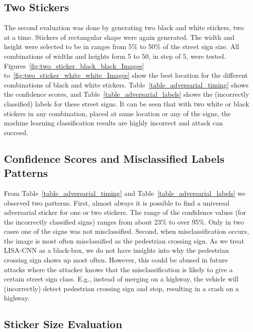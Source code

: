 \subsection{Two Stickers}

The second evaluation was done by generating two black and white stickers, two at a time. Stickers of rectangular shape were again generated. The width and height were selected to be in ranges from 5\% to 50\% of the street sign size. All combinations of widths and heights form 5 to 50, in step of 5, were tested. Figures~\ref{fig:two_sticker_black_black_Images} to~\ref{fig:two_sticker_white_white_Images} show the best location for the different combinations of black and white stickers. Table~\ref{table_adversarial_timing} shows the confidence scores, and Table~\ref{table_adversarial_labels} shows the (incorrectly classified) labels for these street signs. It can be seen that with two white or black stickers in any combination, placed at same location or any of the signs, the machine learning classification results are highly incorrect and attack can succeed.

\subsection{Confidence Scores and Misclassified Labels Patterns}

From Table~\ref{table_adversarial_timing} and Table~\ref{table_adversarial_labels} we observed two patterns.
First, almost always it is possible to find a universal adversarial sticker for one or two stickers. The range of the confidence values (for the incorrectly classified signs) ranges from about 23\% to over 95\%. Only in two cases one of the signs was not misclassified.
Second, when misclassification occurs, the image is most often misclassified as the pedestrian crossing sign. As we treat LISA-CNN as a black-box, we do not have insights into why the pedestrian crossing sign shows up most often. However, this could be abused in future attacks where the attacker knows that the misclassification is likely to give a certain street sign class. E.g., instead of merging on a highway, the vehicle will (incorrectly) detect pedestrian crossing sign and stop, resulting in a crash on a highway.

\subsection{Sticker Size Evaluation}

